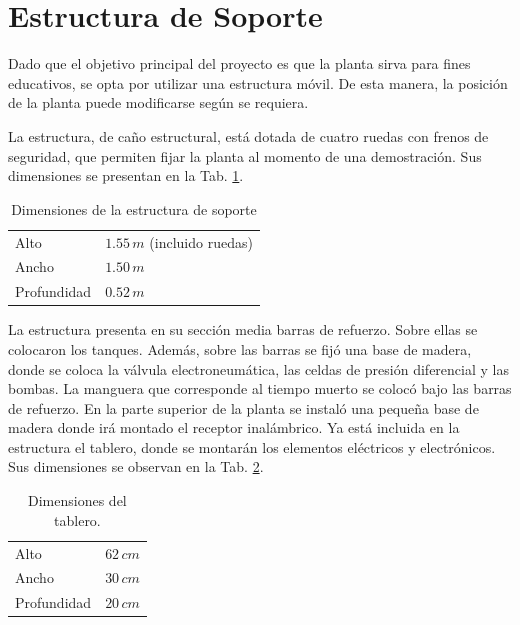 \section{Estructura de Soporte}
\label{sec:EstructuraSoporte}

Dado que el objetivo principal del proyecto es que la planta sirva para fines
educativos, se opta por utilizar una estructura móvil.
De esta manera, la posición de la planta puede modificarse según se requiera.

La estructura, de caño estructural, está dotada de cuatro ruedas con frenos de
seguridad, que permiten fijar la
planta al momento de una demostración.
Sus dimensiones se presentan en la Tab. \ref{tab:dimensionesEstructura}.

\begin{table}[ht]
\renewcommand{\arraystretch}{1.3}
\centering
\begin{tabular}{|l|l|}
\hline
Alto & $1.55\,m$ (incluido ruedas)\\
Ancho &  $1.50\,m$\\
Profundidad &  $0.52\,m$\\
\hline
\end{tabular}
\caption{Dimensiones de la estructura de soporte}
\label{tab:dimensionesEstructura}
\end{table}
 
La estructura presenta en su sección media barras de refuerzo.
Sobre ellas se colocaron los tanques.
Además, sobre las barras se fijó una base de madera, donde se coloca la
válvula electroneumática, las celdas de presión diferencial
y las bombas.
La manguera que corresponde al tiempo muerto se colocó bajo
las barras de refuerzo.
En la parte superior de la planta se instaló una pequeña base de
madera donde irá montado el receptor inalámbrico.
Ya está incluida en la estructura el tablero, donde se
montarán los elementos eléctricos y electrónicos.
Sus dimensiones se observan en la Tab. \ref{tab:dimensionesTablero}.

\begin{table}[h]
\renewcommand{\arraystretch}{1.3}
\centering
\begin{tabular}{|l|l|}
\hline
Alto & $62\,cm$\\
Ancho &  $30\,cm$\\
Profundidad &  $20\,cm$\\
\hline
\end{tabular}
\caption{Dimensiones del tablero.}
\label{tab:dimensionesTablero}
\end{table}


